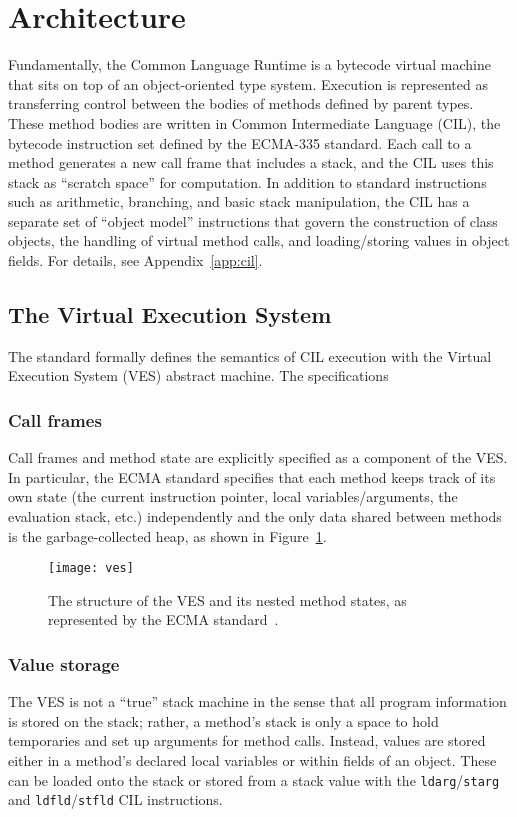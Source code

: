 \section{Architecture}
Fundamentally, the Common Language Runtime is a bytecode virtual machine that sits on top of an object-oriented type system.
Execution is represented as transferring control between the bodies of methods defined by parent types.
These method bodies are written in Common Intermediate Language (CIL), the bytecode instruction set defined by the ECMA-335 standard.
Each call to a method generates a new call frame that includes a stack, and the CIL uses this stack as ``scratch space'' for computation.
In addition to standard instructions such as arithmetic, branching, and basic stack manipulation, the CIL has a separate set of
``object model'' instructions that govern the construction of class objects, the handling of virtual method calls,
and loading/storing values in object fields. For details, see Appendix~\ref{app:cil}.

\subsection{The Virtual Execution System}
The standard formally defines the semantics of CIL execution with the Virtual Execution System (VES) abstract machine.
The specifications

\subsubsection{Call frames}
Call frames and method state are explicitly specified as a component of the VES.
In particular, the ECMA standard specifies that each method keeps track of its own state (the current instruction pointer,
local variables/arguments, the evaluation stack, etc.) independently and the only data shared between methods is the garbage-collected heap,
as shown in Figure~\ref{fig:ves}.

\begin{figure}[h]
    \texttt{[image: ves]}
    \centering
    \captionsetup{justification=centering}
    \caption{The structure of the VES and its nested method states, as represented by the ECMA standard~\cite{ecma335}.}
    \label{fig:ves}
\end{figure}

\subsubsection{Value storage}
The VES is not a ``true'' stack machine in the sense that all program information is stored on the stack;
rather, a method's stack is only a space to hold temporaries and set up arguments for method calls.
Instead, values are stored either in a method's declared local variables or within fields of an object.
These can be loaded onto the stack or stored from a stack value with the \texttt{ldarg}/\texttt{starg} and \texttt{ldfld}/\texttt{stfld}
CIL instructions.

